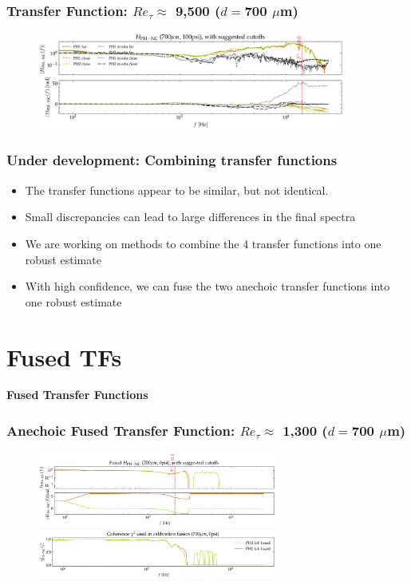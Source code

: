 \documentclass[aspectratio=169,9pt]{beamer}
\begin{document}
\begin{frame}
  \frametitle{Transfer Function: $Re_\tau \approx$ 9,500 ($d=$700 $\mu$m)}
  \begin{figure}
    \centering
    \includegraphics[width=0.9\textwidth]{tf_calib/700_100psi_H_2cal.png}
  \end{figure}
\end{frame}

\begin{frame}
  \frametitle{Under development: Combining transfer functions}
  \begin{itemize}
    \centering
    \item The transfer functions appear to be similar, but not identical.
    \item Small discrepancies can lead to large differences in the final spectra
    \item We are working on methods to combine the 4 transfer functions into one robust estimate
    \item With high confidence, we can fuse the two anechoic transfer functions into one robust estimate
  \end{itemize}
\end{frame}

\section{Fused TFs}

\begin{frame}
  \centering
  \vfill
  {\Huge\bfseries \textcolor{cardinalred}{Fused Transfer Functions}}
  \vfill
\end{frame}

\begin{frame}
  \frametitle{Anechoic Fused Transfer Function: $Re_\tau \approx$ 1,300 ($d=$700 $\mu$m)}
  \begin{figure}
    \centering
    \includegraphics[width=0.7\textwidth]{tf_calib/700_0psi_H_anechoic_fused.png}
    \includegraphics[width=0.7\textwidth]{tf_calib/700_0psi_gamma_fuse.png}
  \end{figure}
\end{frame}
\end{document}
